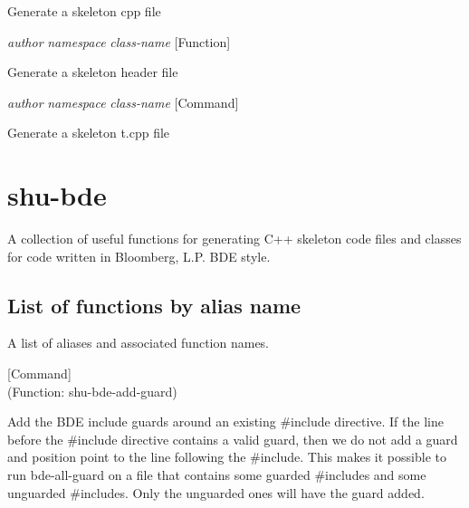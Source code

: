 \begin{doc-string}
Generate a skeleton cpp file
\end{doc-string}

\vspace{1em}
\noindent
{}
\usebox{\funcname}\emph{author} \emph{namespace} \emph{class-name}
 \hfill [Function]

\begin{doc-string}
Generate a skeleton header file
\end{doc-string}

\vspace{1em}
\noindent
{}
\usebox{\funcname}\emph{author} \emph{namespace} \emph{class-name}
 \hfill [Command]

\begin{doc-string}
Generate a skeleton t.cpp file
\end{doc-string}

\eject
\section{shu-bde}


A collection of useful functions for generating C++ skeleton code files
and classes for code written in Bloomberg, L.P. BDE style.


\subsection{List of functions by alias name}

A list of aliases and associated function names.



\vspace{1em}
\noindent
{}
\usebox{\funcname}
 \hfill [Command]\\%
 (Function: shu-bde-add-guard)

\begin{doc-string}
Add the BDE include guards around an existing \#include directive.  If the line
before the \#include directive contains a valid guard, then we do not add a guard
and position point to the line following the \#include.  This makes it possible to
run bde-all-guard on a file that contains some guarded \#includes and some unguarded
\#includes.  Only the unguarded ones will have the guard added.
\end{doc-string}

